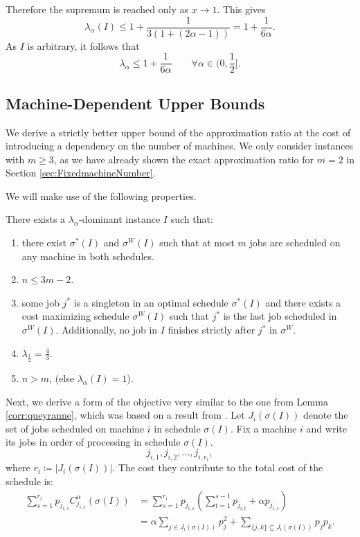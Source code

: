 \documentclass[%
english, titlepage=false %
]{./tum-templates/book/tumbook}
\begin{document}
\noindent
Therefore the supremum is reached only as $x \to 1$. This gives
\[
    \lambda_{\alpha}(I) \le 1+\frac{1}{3(1+(2\alpha-1))} = 1+\frac{1}{6\alpha}.
\]
As $I$ is arbitrary, it follows that
\[
\boxed{\lambda_{\alpha} \le 1+\frac{1}{6\alpha} \qquad \forall \alpha \in \Big(0,\frac12\Big]}.
\]

\subsection*{Machine-Dependent Upper Bounds}
We derive a strictly better upper bound of the approximation ratio at the cost of
introducing a dependency on the number of machines. 
We only consider instances with \(m\ge 3\), as we have already shown the exact approximation ratio for
$m=2$ in Section \ref{sec:FixedmachineNumber}.

We will make use of the following properties.

There exists a $\lambda_{\alpha}$-dominant instance $I$ such that:
\begin{enumerate}
 \item there exist $\sigma^*(I)$ and $\sigma^{W}(I)$ such that at most $m$ jobs are scheduled on any machine in both schedules.
 \item $n \le 3m-2$.
 \item some job $j^*$ is a singleton in an optimal schedule $\sigma^{*}(I)$ and there exists a cost maximizing
 schedule $\sigma^W(I)$ such that $j^*$ is the
 last job scheduled in $\sigma^{W}(I)$. Additionally, no job in $I$ finishes strictly after $j^*$ in $\sigma^{W}$.
 \item $\lambda_{\frac12} = \frac43$.
 \item $n > m$, (else $\lambda_{\alpha}(I) =1$).
\end{enumerate}

Next, we derive a form of the objective very similar to the one from Lemma \ref{corr:queyranne}, which was based on a result from \cite{queyranne1993structure}.
Let $J_i(\sigma(I))$ denote the set of jobs scheduled on machine $i$ in schedule $\sigma(I)$.
Fix a machine $i$ and write its jobs in order of processing in schedule $\sigma(I)$. 
\[
 j_{i,1},j_{i,2},\ldots,j_{i,r_i},
\]
where $r_i \coloneqq |J_i(\sigma(I))|$.
The cost they contribute to the total cost of the schedule is:
\[
\begin{aligned}
\sum_{s=1}^{r_i}p_{j_{i,s}}C_{j_{i,s}}^{\alpha}(\sigma(I))
&=
\sum_{s=1}^{r_i}
p_{j_{i,s}}
\left(
\sum_{t=1}^{s-1}p_{j_{i,t}}
+\alpha p_{j_{i,s}}
\right)\\
&=
\alpha\sum_{j \in J_i(\sigma(I))}p_j^2
+
\sum_{\{j,k\}\subseteq J_i(\sigma(I))}p_jp_k.
\end{aligned}
\]
\end{document}
